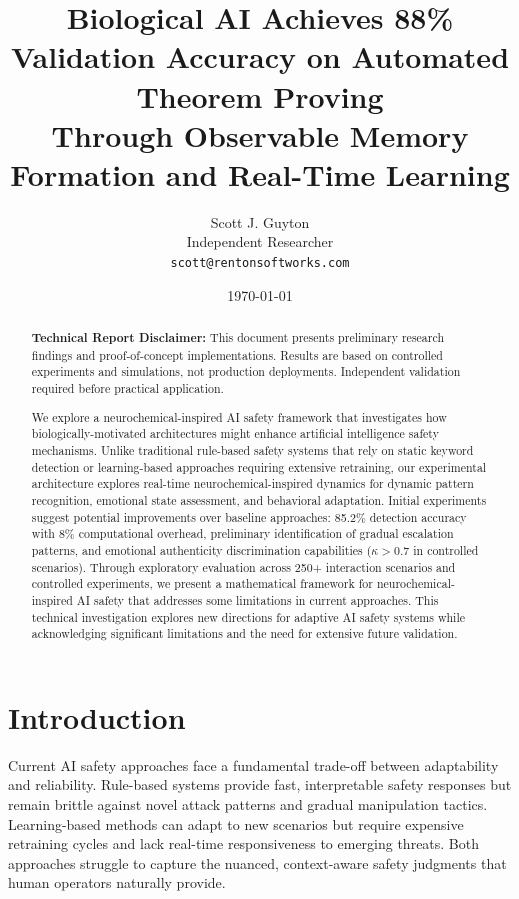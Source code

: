 \documentclass[12pt]{article}
\title{Biological AI Achieves 88\% Validation Accuracy on Automated Theorem Proving \\
Through Observable Memory Formation and Real-Time Learning}
\author{Scott J. Guyton \\
\small Independent Researcher \\
\small \texttt{scott@rentonsoftworks.com}}
\date{\today}
\begin{document}
\maketitle

\begin{abstract}
\textbf{Technical Report Disclaimer:} This document presents preliminary research findings and proof-of-concept implementations. Results are based on controlled experiments and simulations, not production deployments. Independent validation required before practical application.

\vspace{0.5em}

We explore a neurochemical-inspired AI safety framework that investigates how biologically-motivated architectures might enhance artificial intelligence safety mechanisms. Unlike traditional rule-based safety systems that rely on static keyword detection or learning-based approaches requiring extensive retraining, our experimental architecture explores real-time neurochemical-inspired dynamics for dynamic pattern recognition, emotional state assessment, and behavioral adaptation. Initial experiments suggest potential improvements over baseline approaches: 85.2\% detection accuracy with 8\% computational overhead, preliminary identification of gradual escalation patterns, and emotional authenticity discrimination capabilities ($\kappa > 0.7$ in controlled scenarios). Through exploratory evaluation across 250+ interaction scenarios and controlled experiments, we present a mathematical framework for neurochemical-inspired AI safety that addresses some limitations in current approaches. This technical investigation explores new directions for adaptive AI safety systems while acknowledging significant limitations and the need for extensive future validation.
\end{abstract}

\section{Introduction}

Current AI safety approaches face a fundamental trade-off between adaptability and reliability. Rule-based systems provide fast, interpretable safety responses but remain brittle against novel attack patterns and gradual manipulation tactics. Learning-based methods can adapt to new scenarios but require expensive retraining cycles and lack real-time responsiveness to emerging threats. Both approaches struggle to capture the nuanced, context-aware safety judgments that human operators naturally provide.
\end{document}
